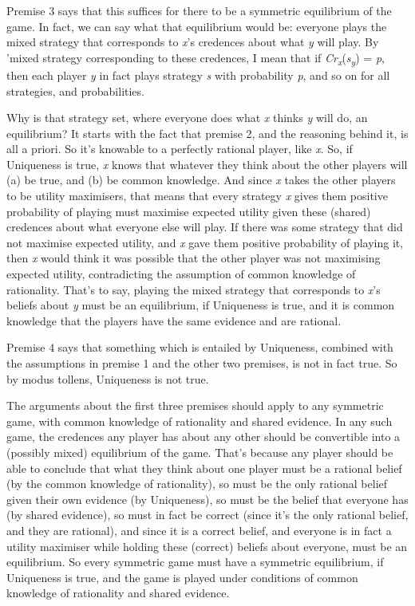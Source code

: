 \documentclass[
  12pt,
  letterpaper,
  DIV=11,
  numbers=noendperiod]{scrreprt}
\begin{document}
Premise 3 says that this suffices for there to be a symmetric
equilibrium of the game. In fact, we can say what that equilibrium would
be: everyone plays the mixed strategy that corresponds to \emph{x}'s
credences about what \emph{y} will play. By 'mixed strategy
corresponding to these credences, I mean that if
\emph{Cr\textsubscript{x}}(\emph{s\textsubscript{y}}) = \emph{p}, then
each player \emph{y} in fact plays strategy \emph{s} with probability
\emph{p}, and so on for all strategies, and probabilities.

Why is that strategy set, where everyone does what \emph{x} thinks
\emph{y} will do, an equilibrium? It starts with the fact that premise
2, and the reasoning behind it, is all a priori. So it's knowable to a
perfectly rational player, like \emph{x}. So, if Uniqueness is true,
\emph{x} knows that whatever they think about the other players will (a)
be true, and (b) be common knowledge. And since \emph{x} takes the other
players to be utility maximisers, that means that every strategy
\emph{x} gives them positive probability of playing must maximise
expected utility given these (shared) credences about what everyone else
will play. If there was some strategy that did not maximise expected
utility, and \emph{x} gave them positive probability of playing it, then
\emph{x} would think it was possible that the other player was not
maximising expected utility, contradicting the assumption of common
knowledge of rationality. That's to say, playing the mixed strategy that
corresponds to \emph{x}'s beliefs about \emph{y} must be an equilibrium,
if Uniqueness is true, and it is common knowledge that the players have
the same evidence and are rational.

Premise 4 says that something which is entailed by Uniqueness, combined
with the assumptions in premise 1 and the other two premises, is not in
fact true. So by modus tollens, Uniqueness is not true.

The arguments about the first three premises should apply to any
symmetric game, with common knowledge of rationality and shared
evidence. In any such game, the credences any player has about any other
should be convertible into a (possibly mixed) equilibrium of the game.
That's because any player should be able to conclude that what they
think about one player must be a rational belief (by the common
knowledge of rationality), so must be the only rational belief given
their own evidence (by Uniqueness), so must be the belief that everyone
has (by shared evidence), so must in fact be correct (since it's the
only rational belief, and they are rational), and since it is a correct
belief, and everyone is in fact a utility maximiser while holding these
(correct) beliefs about everyone, must be an equilibrium. So every
symmetric game must have a symmetric equilibrium, if Uniqueness is true,
and the game is played under conditions of common knowledge of
rationality and shared evidence.
\end{document}

